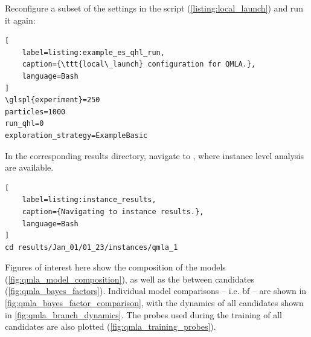 Reconfigure a subset of the settings in the  script (\cref{listing:local_launch}) and run it again:
\begin{lstlisting}[
    label=listing:example_es_qhl_run,
    caption={\ttt{local\_launch} configuration for QMLA.},
    language=Bash
]
\glspl{experiment}=250
particles=1000
run_qhl=0
exploration_strategy=ExampleBasic
\end{lstlisting}

\par 

In the corresponding \gls{results directory}, navigate to , where instance level analysis are available. 

\begin{lstlisting}[
    label=listing:instance_results,
    caption={Navigating to instance results.},
    language=Bash
]
cd results/Jan_01/01_23/instances/qmla_1
\end{lstlisting}

Figures of interest here show the composition of the models (\cref{fig:qmla_model_composition}), 
    as well as the  between candidates (\cref{fig:qmla_bayes_factors}). 
Individual model comparisons -- i.e. \acrfull{bf} -- 
    are shown in \cref{fig:qmla_bayes_factor_comparison}, 
    with the dynamics of all candidates shown in \cref{fig:qmla_branch_dynamics}. 
The probes used during the training of all candidates are also plotted  (\cref{fig:qmla_training_probes}).

